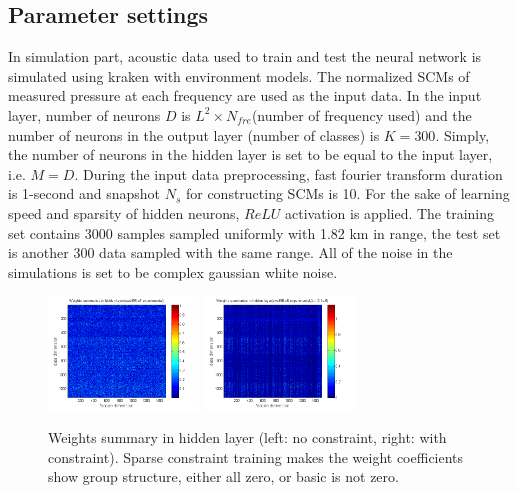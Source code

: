 \subsection{Parameter settings}
In simulation part, acoustic data used to train and test the neural network is simulated using kraken\cite{porter1992kraken} with environment models. The normalized SCMs of measured pressure at each frequency are used as the input data. In the input layer, number of neurons $D$ is $L^{2} \times N_{fre}$(number of frequency used) and the number of neurons in the output layer (number of classes) is $K = 300$. Simply, the number of neurons in the hidden layer is set to be equal to the input layer, i.e. $M = D$. During the input data preprocessing, fast fourier transform duration is 1-second and snapshot $N_{s}$ for constructing SCMs is 10.
For the sake of learning speed and sparsity of hidden neurons, $ReLU$ activation\cite{goodfellow2016deep} is applied.
The training set contains 3000 samples sampled uniformly with 1.82 km in range, the test set is another 300 data sampled with the same range. All of the noise in the simulations is set to be complex gaussian white noise.
\begin{figure}
\includegraphics[width=4cm,height=3cm]{figure/Weights_summaries_in_hidden_laye_swell_exp}
\includegraphics[width=4cm,height=3cm]{figure/Weights_summaries_in_hidden_layer_swell_exp_lambda_2_dot_1e_neg_5}
\caption{Weights summary in hidden layer (left: no constraint, right: with constraint). Sparse constraint
training makes the weight coefficients show group structure, either all zero, or basic is not zero.}
\end{figure}

